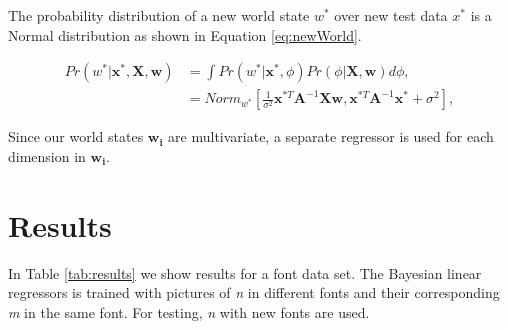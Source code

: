 \documentclass[12pt]{article}
\begin{document}
The probability distribution of a new world state $w^*$ over new test data $x^*$ is a Normal distribution as shown in Equation \ref{eq:newWorld}.

\begin{equation}
\begin{split}
\label{eq:newWorld}
Pr(w^* | \mathbf{x}^*, \mathbf{X}, \mathbf{w}) &= \int Pr(w^* | \mathbf{x}^*, \phi) Pr(\phi | \mathbf{X}, \mathbf{w} ) d \phi,\\
 &= Norm_{w^*} \left[ \frac{1}{\sigma^2} \mathbf{x}^{*T} \mathbf{A}^{-1} \mathbf{X} \mathbf{w}, \mathbf{x}^{*T} \mathbf{A}^{-1} \mathbf{x}^* + \sigma^2  \right],
\end{split}
\end{equation}

Since our world states $\mathbf{w_i}$ are multivariate, a separate regressor is used for each dimension in  $\mathbf{w_i}$.

\section{Results}

In Table \ref{tab:results} we show results for a font data set.
The Bayesian linear regressors is trained with pictures of \emph{n} in different fonts and their corresponding \emph{m} in the same font.
For testing, \emph{n} with new fonts are used.
\end{document}
